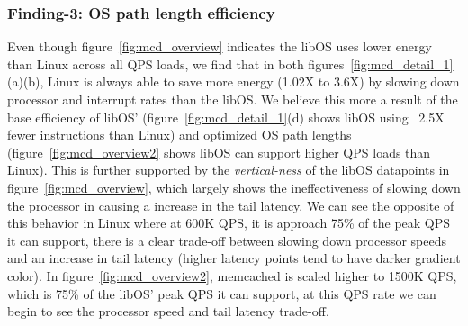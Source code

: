 
\subsubsection{Finding-3: OS path length efficiency} \label{sec:f3}
Even though figure~\ref{fig:mcd_overview} indicates the libOS uses lower energy than Linux across all QPS loads, we find that in both figures~\ref{fig:mcd_detail_1}(a)(b), Linux is always able to save more energy (1.02X to 3.6X) by slowing down processor and interrupt rates than the libOS. We believe this more a result of the base efficiency of libOS' (figure~\ref{fig:mcd_detail_1}(d) shows libOS using ~2.5X fewer instructions than Linux) and optimized OS path lengths (figure~\ref{fig:mcd_overview2} shows libOS can support higher QPS loads than Linux). This is further supported by the \textit{vertical-ness} of the libOS datapoints in figure~\ref{fig:mcd_overview}, which largely shows the ineffectiveness of slowing down the processor in causing a increase in the tail latency. We can see the opposite of this behavior in Linux where at 600K QPS, it is approach 75\% of the peak QPS it can support, there is a clear trade-off between slowing down processor speeds and an increase in tail latency (higher latency points tend to have darker gradient color). In figure~\ref{fig:mcd_overview2}, memcached is scaled higher to 1500K QPS, which is 75\% of the libOS' peak QPS it can support, at this QPS rate we can begin to see the processor speed and tail latency trade-off.



